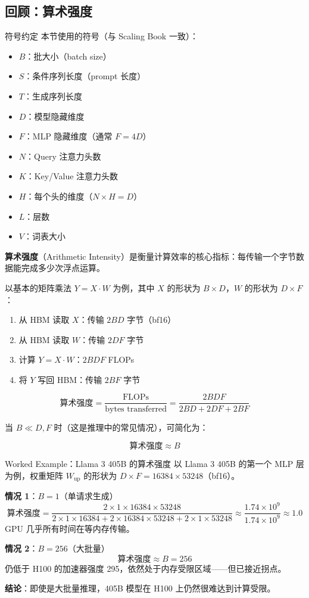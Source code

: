 \subsection{回顾：算术强度}

\begin{knowledgebox}{符号约定}
本节使用的符号（与 Scaling Book 一致）：
\begin{itemize}
    \item $B$：批大小（batch size）
    \item $S$：条件序列长度（prompt 长度）
    \item $T$：生成序列长度
    \item $D$：模型隐藏维度
    \item $F$：MLP 隐藏维度（通常 $F = 4D$）
    \item $N$：Query 注意力头数
    \item $K$：Key/Value 注意力头数
    \item $H$：每个头的维度（$N \times H = D$）
    \item $L$：层数
    \item $V$：词表大小
\end{itemize}
\end{knowledgebox}

\textbf{算术强度}（Arithmetic Intensity）是衡量计算效率的核心指标：每传输一个字节数据能完成多少次浮点运算。

以基本的矩阵乘法 $Y = X \cdot W$ 为例，其中 $X$ 的形状为 $B \times D$，$W$ 的形状为 $D \times F$：

\begin{enumerate}
    \item 从 HBM 读取 $X$：传输 $2BD$ 字节（bf16）
    \item 从 HBM 读取 $W$：传输 $2DF$ 字节
    \item 计算 $Y = X \cdot W$：$2BDF$ FLOPs
    \item 将 $Y$ 写回 HBM：传输 $2BF$ 字节
\end{enumerate}

$$\text{算术强度} = \frac{\text{FLOPs}}{\text{bytes transferred}} = \frac{2BDF}{2BD + 2DF + 2BF}$$

当 $B \ll D, F$ 时（这是推理中的常见情况），可简化为：

$$\text{算术强度} \approx B$$

\begin{knowledgebox}{Worked Example：Llama 3 405B 的算术强度}
以 Llama 3 405B 的第一个 MLP 层为例，权重矩阵 $W_\text{up}$ 的形状为 $D \times F = 16384 \times 53248$（bf16）。

\textbf{情况 1}：$B=1$（单请求生成）
$$\text{算术强度} = \frac{2 \times 1 \times 16384 \times 53248}{2 \times 1 \times 16384 + 2 \times 16384 \times 53248 + 2 \times 1 \times 53248} \approx \frac{1.74 \times 10^9}{1.74 \times 10^9} \approx 1.0$$
GPU 几乎所有时间在等内存传输。

\textbf{情况 2}：$B=256$（大批量）
$$\text{算术强度} \approx B = 256$$
仍低于 H100 的加速器强度 295，依然处于内存受限区域——但已接近拐点。

\textbf{结论}：即使是大批量推理，405B 模型在 H100 上仍然很难达到计算受限。
\end{knowledgebox}

